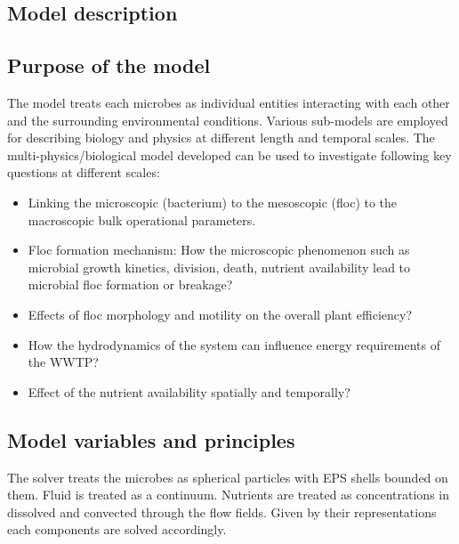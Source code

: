 \documentclass[11pt,a4paper,openright]{article}
\begin{document}
\subsection{Model description}

\subsection{Purpose of the model}

The model treats each microbes as individual entities interacting with each other and the surrounding environmental conditions. Various sub-models are employed for describing biology and physics at different length and temporal scales. 
The multi-physics/biological model developed can be used to investigate following key questions at different scales:

\begin{itemize}
\item Linking the microscopic (bacterium) to the mesoscopic (floc) to the macroscopic bulk operational parameters. 
\item Floc formation mechanism: How the microscopic phenomenon such as microbial growth kinetics, division, death, nutrient availability lead to microbial floc formation or breakage?
\item Effects of floc morphology and motility on the overall plant efficiency? 
\item How the hydrodynamics of the system can influence energy requirements of the WWTP?
\item Effect of the nutrient availability spatially and temporally?
\end{itemize}

\subsection{Model variables and principles}

The solver treats the microbes as spherical particles with EPS shells bounded on them. Fluid is treated as a continuum.
Nutrients are treated as concentrations in dissolved and convected through the flow fields. Given by their representations each components are solved accordingly. 
\end{document}
